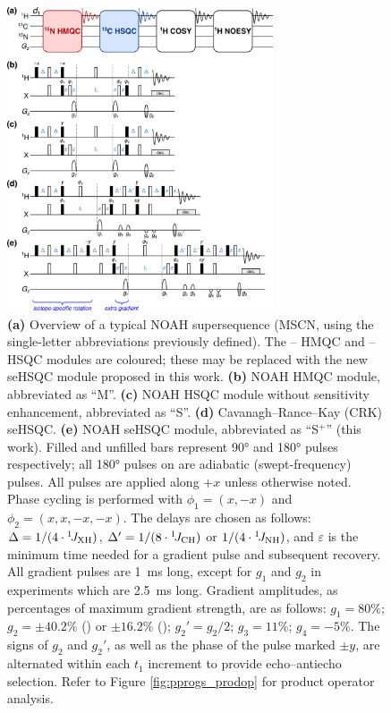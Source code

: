 \documentclass[11pt]{article}
\newcommand*{\noahSp}{S$^+$}
\newcommand*{\carbon}{\ce{^{13}C}}
\newcommand*{\proton}{\ce{^{1}H}}
\newcommand*{\nitrogen}{\ce{^{15}N}}
\newcommand*{\onejxh}{{}^{1}\!J_{\ce{XH}}}
\newcommand*{\onejch}{{}^{1}\!J_{\ce{CH}}}
\newcommand*{\onejnh}{{}^{1}\!J_{\ce{NH}}}
\newcommand*{\figref}[1]{Figure \ref{fig:#1}}
\begin{document}
\begin{figure}
    \centering
    \includegraphics[width=0.7\textwidth]{pprogs.png}
    \caption{
        \textbf{(a)} Overview of a typical NOAH supersequence (MSCN, using the single-letter abbreviations previously defined\autocite{Kupce2017ACIE}).
        The \nitrogen{}--\proton{} HMQC and \carbon{}--\proton{} HSQC modules are coloured; these may be replaced with the new seHSQC module proposed in this work.
        \textbf{(b)} NOAH HMQC module,\autocite{Kupce2017ACIE, Kupce2007MRC} abbreviated as ``M''.
        \textbf{(c)} NOAH HSQC module without sensitivity enhancement,\autocite{Kupce2017ACIE, Schulze-Sunninghausen2017JMR} abbreviated as ``S''.
        \textbf{(d)} Cavanagh--Rance--Kay (CRK) seHSQC.\autocite{sehsqc}
        \textbf{(e)} NOAH seHSQC module, abbreviated as ``\noahSp{}'' (this work).
        Filled and unfilled bars represent \ang{90} and \ang{180} pulses respectively; all \ang{180} pulses on \carbon{} are adiabatic (swept-frequency) pulses.
        All pulses are applied along $+x$ unless otherwise noted.
        Phase cycling is performed with $\phi_1 = (x, -x)$ and $\phi_2 = (x, x, -x, -x)$.
        The delays are chosen as follows: $\Delta = 1/(4\cdot\onejxh)$, $\Delta' = 1/(8\cdot\onejch)$ or $1/(4\cdot\onejnh)$, and $\varepsilon$ is the minimum time needed for a gradient pulse and subsequent recovery.
        All gradient pulses are \SI{1}{\ms} long, except for $g_1$ and $g_2$ in \nitrogen{} experiments which are \SI{2.5}{\ms} long.
        Gradient amplitudes, as percentages of maximum gradient strength, are as follows: $g_1 = 80\%$; $g_2 = \pm 40.2\%$ (\carbon{}) or $\pm 16.2\%$ (\nitrogen{}); ${g_2}' = g_2/2$; $g_3 = 11\%$; $g_4 = -5\%$.
        The signs of $g_2$ and ${g_2}'$, as well as the phase of the \carbon{} pulse marked $\pm y$, are alternated within each $t_1$ increment to provide echo--antiecho selection.
        Refer to \figref{pprogs_prodop} for product operator analysis.
    }
    \label{fig:pprogs}
\end{figure}
\end{document}
